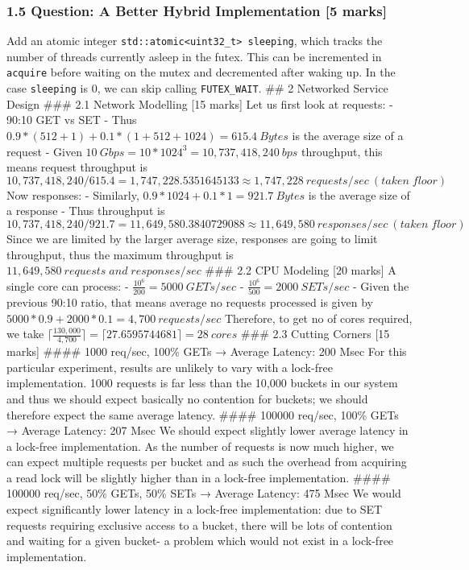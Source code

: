 \documentclass[
]{article}
\begin{document}
\subsubsection{1.5 Question: A Better Hybrid Implementation {[}5
marks{]}}\label{question-a-better-hybrid-implementation-5-marks}

Add an atomic integer
\texttt{std::atomic\textless{}uint32\_t\textgreater{}\ sleeping}, which
tracks the number of threads currently asleep in the futex. This can be
incremented in \texttt{acquire} before waiting on the mutex and
decremented after waking up. In the case \texttt{sleeping} is 0, we can
skip calling \texttt{FUTEX\_WAIT}. \#\# 2 Networked Service Design
\#\#\# 2.1 Network Modelling {[}15 marks{]} Let us first look at
requests: - 90:10 GET vs SET - Thus
\(0.9 * (512 + 1) + 0.1 * (1 + 512 + 1024) = 615.4\:Bytes\) is the
average size of a request - Given
\(10\:Gbps = 10 * 1024^{3} = 10,737,418,240\: bps\) throughput, this
means request throughput is
\(10,737,418,240 / 615.4 = 1,747,228.5351645133 \approx 1,747,228\:requests/sec\:(taken\; floor)\)
Now responses: - Similarly, \(0.9 * 1024 + 0.1 * 1 = 921.7\:Bytes\) is
the average size of a response - Thus throughput is
\(10,737,418,240 / 921.7 = 11,649,580.3840729088 \approx 11,649,580\:responses/sec\:(taken\; floor)\)
Since we are limited by the larger average size, responses are going to
limit throughput, thus the maximum throughput is
\(11,649,580\:requests\; and\; responses/sec\) \#\#\# 2.2 CPU Modeling
{[}20 marks{]} A single core can process: -
\(\frac{10^{6}}{200} = 5000\: GETs/sec\) -
\(\frac{10^{6}}{500} = 2000\: SETs/sec\) - Given the previous 90:10
ratio, that means average no requests processed is given by
\(5000 * 0.9 + 2000 * 0.1 = 4,700\:requests/sec\) Therefore, to get no
of cores required, we take
\(\lceil \frac{130,000}{4,700} \rceil = \lceil 27.6595744681 \rceil = 28\: cores\)
\#\#\# 2.3 Cutting Corners {[}15 marks{]} \#\#\#\# 1000 req/sec, 100\%
GETs → Average Latency: 200 Μsec For this particular experiment, results
are unlikely to vary with a lock-free implementation. 1000 requests is
far less than the 10,000 buckets in our system and thus we should expect
basically no contention for buckets; we should therefore expect the same
average latency. \#\#\#\# 100000 req/sec, 100\% GETs → Average Latency:
207 Μsec We should expect slightly lower average latency in a lock-free
implementation. As the number of requests is now much higher, we can
expect multiple requests per bucket and as such the overhead from
acquiring a read lock will be slightly higher than in a lock-free
implementation. \#\#\#\# 100000 req/sec, 50\% GETs, 50\% SETs → Average
Latency: 475 Μsec We would expect significantly lower latency in a
lock-free implementation: due to SET requests requiring exclusive access
to a bucket, there will be lots of contention and waiting for a given
bucket- a problem which would not exist in a lock-free implementation.
\end{document}
